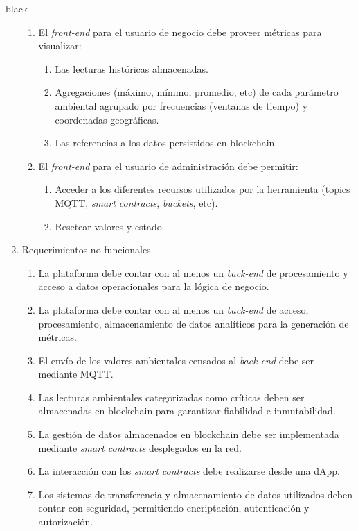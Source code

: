 \documentclass[
11pt, %
]{charter}
\begin{document}
\begin{consigna}{black}
\begin{enumerate}
\begin{enumerate}
		\item El \textit{front-end} para el usuario de negocio debe proveer métricas para visualizar:
			\begin{enumerate}				
				\item Las lecturas históricas almacenadas.				
				\item Agregaciones (máximo, mínimo, promedio, etc) de cada parámetro ambiental agrupado por frecuencias (ventanas de tiempo) y coordenadas geográficas.				
				\item Las referencias a los datos persistidos en blockchain.
			\end{enumerate}			
		\item El \textit{front-end} para el usuario de administración debe permitir:
			\begin{enumerate}				
				\item Acceder a los diferentes recursos utilizados por la herramienta (topics MQTT, \textit{smart contracts}, \textit{buckets}, etc).
				\item Resetear valores y estado.			
			\end{enumerate}			
		\end{enumerate}	

					
	\item Requerimientos no funcionales		
	\begin{enumerate}	
		\item La plataforma debe contar con al menos un \textit{back-end} de procesamiento y acceso a datos operacionales para la lógica de negocio.
		\item La plataforma debe contar con al menos un \textit{back-end} de acceso, procesamiento, almacenamiento de datos analíticos para la generación de métricas.		
		\item El envío de los valores ambientales censados al \textit{back-end} debe ser mediante MQTT.
		\item Las lecturas ambientales categorizadas como críticas deben ser almacenadas en blockchain para garantizar fiabilidad e inmutabilidad.
		\item La gestión de datos almacenados en blockchain debe ser implementada mediante \textit{smart contracts} desplegados en la red.
		\item La interacción con los \textit{smart contracts} debe realizarse desde una dApp.
		\item Los sistemas de transferencia y almacenamiento de datos utilizados deben contar con seguridad, permitiendo encriptación, autenticación y autorización.	
		\end{enumerate}	
		

\end{enumerate}
\end{consigna}
\end{document}
